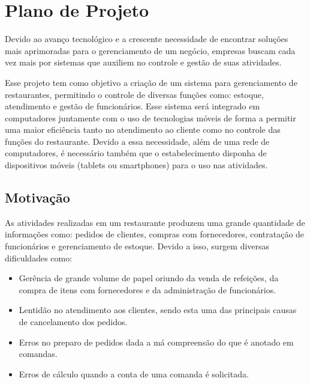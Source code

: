 \section{Plano de Projeto}

Devido ao avanço tecnológico e a crescente necessidade de encontrar soluções mais aprimoradas para o gerenciamento de um negócio, empresas buscam cada vez mais por sistemas que auxiliem no controle e gestão de suas atividades.

Esse projeto tem como objetivo a criação de um sistema para gerenciamento de restaurantes, permitindo o controle de diversas funções como: estoque, atendimento e gestão de funcionários. Esse sistema será integrado em computadores juntamente com o uso de tecnologias móveis de forma a permitir uma maior eficiência tanto no atendimento ao cliente como no controle das funções do restaurante. Devido a essa necessidade, além de uma rede de computadores, é necessário também que o estabelecimento disponha de dispositivos móveis (tablets ou smartphones) para o uso nas atividades.

\subsection{Motivação}

As atividades realizadas em um restaurante produzem uma grande quantidade de informações como: pedidos de clientes, compras com fornecedores, contratação de funcionários e gerenciamento de estoque. Devido a isso, surgem diversas dificuldades como:

\begin{itemize}
\item Gerência de grande volume de papel oriundo da venda de refeições, da compra de itens com fornecedores e da administração de funcionários.
\item Lentidão no atendimento aos clientes, sendo esta uma das principais causas de cancelamento dos pedidos.
\item Erros no preparo de pedidos dada a má compreensão do que é anotado em comandas.
\item Erros de cálculo quando a conta de uma comanda é solicitada.
\end{itemize}
